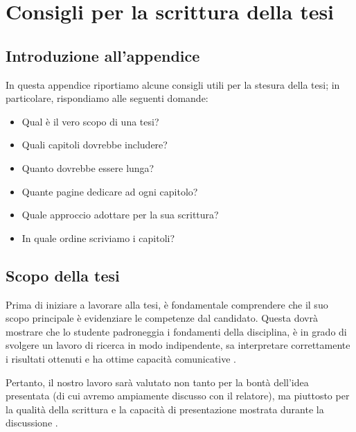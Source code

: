 \chapter{Consigli per la scrittura della tesi}
\label{appendix:scrittura}

\acresetall

\section{Introduzione all'appendice}

In questa appendice riportiamo alcune consigli utili per la stesura della tesi; in particolare, rispondiamo alle seguenti domande: 
\begin{itemize}
\item Qual è il vero scopo di una tesi?
\item Quali capitoli dovrebbe includere?
\item Quanto dovrebbe essere lunga?
\item Quante pagine dedicare ad ogni capitolo?
\item Quale approccio adottare per la sua scrittura?
\item In quale ordine scriviamo i capitoli?
\end{itemize}

\section{Scopo della tesi}

Prima di iniziare a lavorare alla tesi, è fondamentale comprendere che il suo scopo principale è evidenziare le competenze dal candidato. Questa dovrà mostrare che lo studente padroneggia i fondamenti della disciplina, è in grado di svolgere un lavoro di ricerca in modo indipendente, sa interpretare correttamente i risultati ottenuti e ha ottime capacità comunicative \cite{zobel2015writing}.

\medskip

Pertanto, il nostro lavoro sarà valutato non tanto per la bontà dell'idea presentata (di cui avremo ampiamente discusso con il relatore), ma piuttosto per la qualità della scrittura e la capacità di presentazione mostrata durante la discussione \cite{pfandzelter2022thesis}.

\medskip

